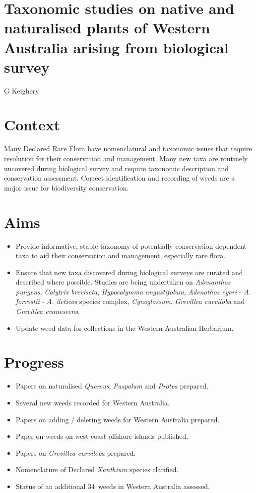 \documentclass[version=last,
    paper=a4, %
    10pt, %
    usenames,
    dvipsnames,
    oneside, %
    headings=openany, %
    DIV=15 %
]{scrbook}
\begin{document}
\section*{Taxonomic studies on native and naturalised plants of Western Australia
arising from biological survey
}

G Keighery


\section*{Context}
Many Declared Rare Flora have nomenclatural and taxonomic issues that
require resolution for their conservation and management. Many new taxa
are routinely uncovered during biological survey and require taxonomic
description and conservation assessment. Correct identification and
recording of weeds are a major issue for biodiversity conservation.



\section*{Aims}
\begin{itemize}
\itemsep1pt\parskip0pt
\item
  Provide informative, stable taxonomy of potentially
  conservation-dependent taxa to aid their conservation and management,
  especially rare flora.
\item
  Ensure that new taxa discovered during biological surveys are curated
  and described where possible. Studies are being undertaken on
  \emph{Adenanthos pungens}, \emph{Calytrix breviseta},
  \emph{Hypocalymma angustifolum}, \emph{Adenathos eyeri} - \emph{A.
  forrestii} - \emph{A. ileticos} species complex, \emph{Cynoglossum},
  \emph{Grevillea curviloba} and \emph{Grevillea evanescens}.
\item
  Update weed data for collections in the Western Australian Herbarium.
\end{itemize}



\section*{Progress}
\begin{itemize}
\itemsep1pt\parskip0pt
\item
  Papers on naturalised \emph{Quercus}, \emph{Paspalum} and
  \emph{Protea} prepared.
\item
  Several new weeds recorded for Western Australia.
\item
  Papers on adding / deleting weeds for Western Australia prepared.
\item
  Paper on weeds on west coast offshore islands published.
\item
  Papers on \emph{Grevillea curviloba} prepared.
\item
  Nomenclature of Declared \emph{Xanthium} species clarified.
\item
  Status of an additional 34~weeds in Western Australia assessed.~
\end{itemize}
\end{document}
